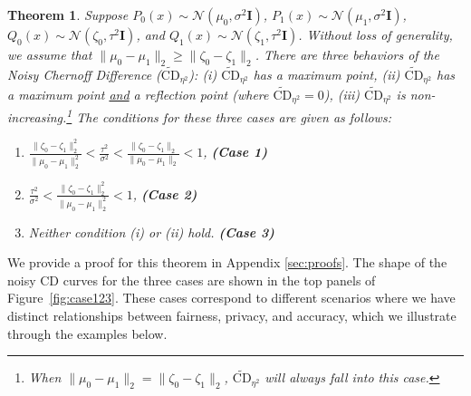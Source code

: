 \documentclass[11pt,letterpaper]{article}
\newtheorem{theorem}{Theorem}
\begin{document}
\begin{theorem} \label{thm:central}
Suppose $P_0(x)\sim\mathcal{N}(\mu_0,\sigma^2\mathbf{I})$, $P_1(x)\sim\mathcal{N}(\mu_1,\sigma^2\mathbf{I})$, $Q_0(x)\sim\mathcal{N}(\zeta_0,\tau^2\mathbf{I})$, and $Q_1(x)\sim\mathcal{N}(\zeta_1,\tau^2\mathbf{I})$. Without loss of generality, we assume that $\|\mu_0 - \mu_1\|_2 \geq \|\zeta_0 - \zeta_1\|_2$. There are three behaviors of the Noisy Chernoff Difference ($\widetilde{\text{CD}}_{\eta^2}$): (i) $\widetilde{\text{CD}}_{\eta^2}$ has a maximum point, (ii) $\widetilde{\text{CD}}_{\eta^2}$ has a maximum point \underline{and} a reflection point (where $\widetilde{\text{CD}}_{\eta^2} = 0$), (iii) $\widetilde{\text{CD}}_{\eta^2}$ is non-increasing.\footnote{When $\|\mu_0 - \mu_1\|_2 = \|\zeta_0 - \zeta_1\|_2$, $\widetilde{\text{CD}}_{\eta^2}$ will always fall into this case.} The conditions for these three cases are given as follows:
    \begin{enumerate}
        \item[(i)] $\frac{\|\zeta_0 - \zeta_1\|^2_2}{\|\mu_0 - \mu_1\|^2_2} <\frac{\tau^2}{\sigma^2} < \frac{\|\zeta_0 - \zeta_1\|_2}{\|\mu_0 - \mu_1\|_2} < 1$,  \hfill \textbf{(Case 1)}
        \item [(ii)] $\frac{\tau^2}{\sigma^2} < \frac{\|\zeta_0 - \zeta_1\|^2_2}{\|\mu_0 - \mu_1\|^2_2} < 1$, \hfill \textbf{(Case 2)}
        \item [(iii)] Neither condition (i) or (ii) hold. \hfill \textbf{(Case 3)}
    \end{enumerate}    %
\end{theorem}
We provide a proof for this theorem in Appendix \ref{sec:proofs}. 
The shape of the noisy CD curves for the three cases are shown in the top panels of Figure~\ref{fig:case123}.
These cases correspond to different scenarios where we have distinct relationships between fairness, privacy, and accuracy, which we illustrate through the examples below.
\end{document}
